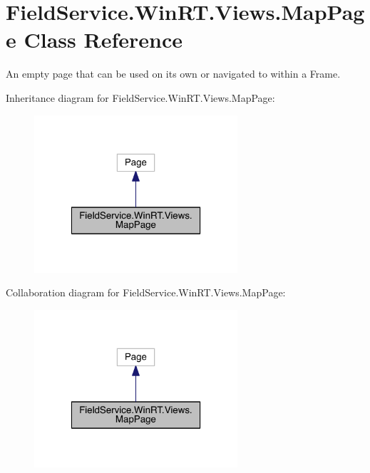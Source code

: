 \hypertarget{class_field_service_1_1_win_r_t_1_1_views_1_1_map_page}{\section{Field\+Service.\+Win\+R\+T.\+Views.\+Map\+Page Class Reference}
\label{class_field_service_1_1_win_r_t_1_1_views_1_1_map_page}
}


An empty page that can be used on its own or navigated to within a Frame.  




Inheritance diagram for Field\+Service.\+Win\+R\+T.\+Views.\+Map\+Page\+:
\nopagebreak
\begin{figure}[H]
\begin{center}
\leavevmode
\includegraphics[width=214pt]{class_field_service_1_1_win_r_t_1_1_views_1_1_map_page__inherit__graph}
\end{center}
\end{figure}


Collaboration diagram for Field\+Service.\+Win\+R\+T.\+Views.\+Map\+Page\+:
\nopagebreak
\begin{figure}[H]
\begin{center}
\leavevmode
\includegraphics[width=214pt]{class_field_service_1_1_win_r_t_1_1_views_1_1_map_page__coll__graph}
\end{center}
\end{figure}
